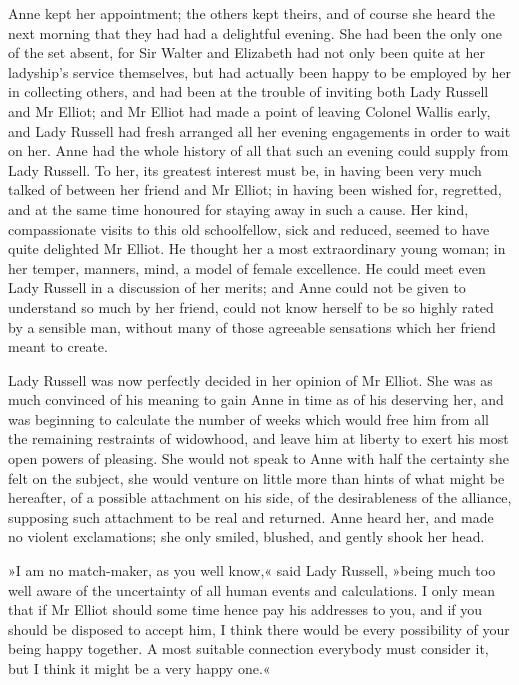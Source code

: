 Anne kept her appointment; the others kept theirs, and of course she heard the next morning that they had had a delightful evening. She had been the only one of the set absent, for Sir Walter and Elizabeth had not only been quite at her ladyship's service themselves, but had actually been happy to be employed by her in collecting others, and had been at the trouble of inviting both Lady Russell and Mr Elliot; and Mr Elliot had made a point of leaving Colonel Wallis early, and Lady Russell had fresh arranged all her evening engagements in order to wait on her. Anne had the whole history of all that such an evening could supply from Lady Russell. To her, its greatest interest must be, in having been very much talked of between her friend and Mr Elliot; in having been wished for, regretted, and at the same time honoured for staying away in such a cause. Her kind, compassionate visits to this old schoolfellow, sick and reduced, seemed to have quite delighted Mr Elliot. He thought her a most extraordinary young woman; in her temper, manners, mind, a model of female excellence. He could meet even Lady Russell in a discussion of her merits; and Anne could not be given to understand so much by her friend, could not know herself to be so highly rated by a sensible man, without many of those agreeable sensations which her friend meant to create.

Lady Russell was now perfectly decided in her opinion of Mr Elliot. She was as much convinced of his meaning to gain Anne in time as of his deserving her, and was beginning to calculate the number of weeks which would free him from all the remaining restraints of widowhood, and leave him at liberty to exert his most open powers of pleasing. She would not speak to Anne with half the certainty she felt on the subject, she would venture on little more than hints of what might be hereafter, of a possible attachment on his side, of the desirableness of the alliance, supposing such attachment to be real and returned. Anne heard her, and made no violent exclamations; she only smiled, blushed, and gently shook her head.

»I am no match-maker, as you well know,« said Lady Russell, »being much too well aware of the uncertainty of all human events and calculations. I only mean that if Mr Elliot should some time hence pay his addresses to you, and if you should be disposed to accept him, I think there would be every possibility of your being happy together. A most suitable connection everybody must consider it, but I think it might be a very happy one.«

